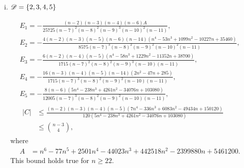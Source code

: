 \documentclass{amsart}
\begin{document}
{\begin{enumerate}[(i)]
\begin{gather*}
E_1=-\frac{(n-1)(n-2)(n-3)(n-4)(n-5)(n-6)\left(n^3-45n^2+728n-3856\right)}{1715(n-7)^3(n-8)^3(n-9)^2(n-10)},\\ E_2=-\frac{(n-1)(n-2)(n-4)(n-6)\left(n^4-68n^3+1871n^2-23068n+102720\right)}{735(n-7)^3(n-8)^2(n-9)(n-10)(n-11)(n-12)},\\ 
E_3=-\frac{8(n-1)(n-3)(n-5)(n-6)\left(2n^4-136n^3+3409n^2-36656n+142272\right)}{735(n-7)^3(n-8)^2(n-9)^2(n-10)(n-11)(n-12)},\\
E_4=-\frac{8(n-2)(n-3)(n-6)^2\left(n^3-45n^2+668n-3216\right)}{49(n-7)^3(n-8)^3(n-9)^2(n-10)(n-12)},\\
E_5=-\frac{8(n-4)(n-5)(n-6)\left(4n^4-231n^3+4976n^2-47841n+172692\right)}{343(n-7)^4(n-8)^2(n-9)^2(n-10)(n-11)(n-12)},\\
\begin{aligned}
|C| &\le \frac{(n-1)(n-2)(n-3)(n-6)\left(3n^4-176n^3+4029n^2-41296n+156816\right)}{120\left(4n^4-231n^3+4976n^2-47841n+172692\right)}\\
&\leq \binom{n-3}{4}.
\end{aligned}
\end{gather*}
This bound holds true for $n\ge 23.$

\item $\mathscr{D}=\{2,3,4,5\}$

\begin{gather*}
E_1=-\frac{(n-2)(n-3)(n-4)(n-6)A}{25725(n-7)^2(n-8)^2(n-9)^3(n-10)^2(n-11)},\\ 
E_2=-\frac{4(n-2)(n-3)(n-5)(n-6)(n-14)\left(n^4-53n^3+1099n^2-10227n+35460\right)}{8575(n-7)^3(n-8)^2(n-9)^2(n-10)^2(n-11)},\\
E_3=-\frac{6(n-2)(n-4)(n-5)\left(n^4-58n^3+1229n^2-11352n+38700\right)}{1715(n-7)^2(n-8)^2(n-9)^3(n-10)(n-11)},\\
E_4=-\frac{16(n-3)(n-4)(n-5)(n-14)\left(2n^2-47n+285\right)}{1715(n-7)^3(n-8)^2(n-9)^2(n-10)(n-11)},\\
E_5=-\frac{8(n-6)\left(5n^4-238n^3+4261n^2-34076n+103080\right)}{12005(n-7)^3(n-8)^2(n-9)^2(n-10)(n-11)},\\
\begin{aligned}
|C| &\le \frac{(n-2)(n-3)(n-4)(n-5)\left(7n^4-336n^3+6083n^2-49434n+150120\right)}{120\left(5n^4-238n^3+4261n^2-34076n+103080\right)}\\
&\leq \binom{n-3}{4},
\end{aligned}
\end{gather*}
where
\begin{align*}
    A &=n^6-77n^5+2501n^4-44023n^3+442518n^2-2399880n+5461200.
\end{align*}
This bound holds true for $n\ge 22.$


\end{enumerate}}
\end{document}
